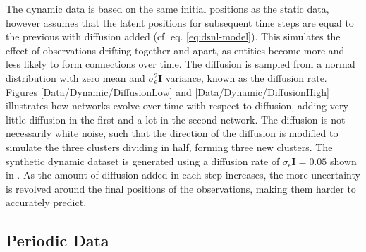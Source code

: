         The dynamic data is based on the same initial positions as the static data, however assumes that the latent positions for subsequent time steps are equal to the previous with diffusion added (cf. eq. \ref{eq:dsnl-model}). This simulates the effect of observations drifting together and apart, as entities become more and less likely to form connections over time. The diffusion is sampled from a normal distribution with zero mean and $\sigma_\epsilon^2\bm{I}$ variance, known as the diffusion rate. Figures \ref{Data/Dynamic/DiffusionLow} and \ref{Data/Dynamic/DiffusionHigh} illustrates how networks evolve over time with respect to diffusion, adding very little diffusion in the first and a lot in the second network.
        The diffusion is not necessarily white noise, such that the direction of the diffusion is modified to simulate the three clusters dividing in half, forming three new clusters.
        The synthetic dynamic dataset is generated using a diffusion rate of $\sigma_\epsilon\bm{I}=0.05$ shown in . 
        As the amount of diffusion added in each step increases, the more uncertainty is revolved around the final positions of the observations, making them harder to accurately predict.
    
    \subsection{Periodic Data}
    
